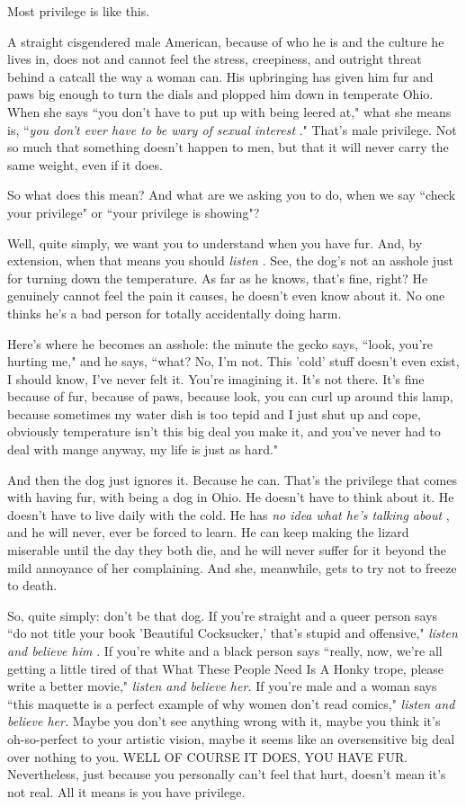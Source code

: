 \documentclass[11pt]{article}
\begin{document}
Most privilege is like this.

A straight cisgendered male American, because of who he is and the culture he lives in, does not and cannot feel the stress, creepiness, and outright threat behind a catcall the way a woman can. His upbringing has given him fur and paws big enough to turn the dials and plopped him down in temperate Ohio. When she says ``you don't have to put up with being leered at," what she means is, ``{\it you don't ever have to be wary of sexual interest} ." That's male privilege. Not so much that something doesn't happen to men, but that it will never carry the same weight, even if it does.

So what does this mean? And what are we asking you to do, when we say ``check your privilege" or ``your privilege is showing"?

Well, quite simply, we want you to understand when you have fur. And, by extension, when that means you should {\it listen} . See, the dog's not an asshole just for turning down the temperature. As far as he knows, that's fine, right? He genuinely cannot feel the pain it causes, he doesn't even know about it. No one thinks he's a bad person for totally accidentally doing harm.

Here's where he becomes an asshole: the minute the gecko says, ``look, you're hurting me," and he says, ``what? No, I'm not. This 'cold' stuff doesn't even exist, I should know, I've never felt it. You're imagining it. It's not there. It's fine because of fur, because of paws, because look, you can curl up around this lamp, because sometimes my water dish is too tepid and I just shut up and cope, obviously temperature isn't this big deal you make it, and you've never had to deal with mange anyway, my life is just as hard."

And then the dog just ignores it. Because he can. That's the privilege that comes with having fur, with being a dog in Ohio. He doesn't have to think about it. He doesn't have to live daily with the cold. He has {\it no idea what he's talking about} , and he will never, ever be forced to learn. He can keep making the lizard miserable until the day they both die, and he will never suffer for it beyond the mild annoyance of her complaining. And she, meanwhile, gets to try not to freeze to death.

So, quite simply: don't be that dog. If you're straight and a queer person says ``do not title your book 'Beautiful Cocksucker,' that's stupid and offensive," {\it listen and believe him} . If you're white and a black person says ``really, now, we're all getting a little tired of that What These People Need Is A Honky trope, please write a better movie," {\it listen and believe her.}  If you're male and a woman says ``this maquette is a perfect example of why women don't read comics," {\it listen and believe her.}  Maybe you don't see anything wrong with it, maybe you think it's oh-so-perfect to your artistic vision, maybe it seems like an oversensitive big deal over nothing to you. WELL OF COURSE IT DOES, YOU HAVE FUR. Nevertheless, just because you personally can't feel that hurt, doesn't mean it's not real. All it means is you have privilege.
\end{document}
